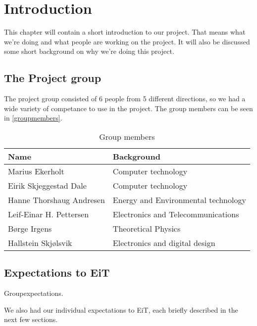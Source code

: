 \chapter{Introduction}
\label{chap:introduction}
This chapter will contain a short introduction to our project. That means what we're doing and what people are working on the project. It will also be discussed some short background on why we're doing this project.
\section{The Project group}
The project group consisted of 6 people from 5 different directions, so we had a wide variety of competance to use in the project. The group members can be seen in \autoref{groupmembers}.
\begin{table}
	\begin{center}
		\begin{tabular}{|p{4cm}|p{7cm}|}   
			\hline      
			\bf{Name} & \bf{Background} \\ 
			\hline
			Marius Ekerholt & Computer technology\\     
			\hline
			Eirik Skjeggestad Dale & Computer technology\\     
			\hline
			Hanne Thorshaug Andresen & Energy and Environmental technology\\     
			\hline
			Leif-Einar H. Pettersen & Electronics and Telecommunications\\     
			\hline
			Børge Irgens & Theoretical Physics\\     
			\hline
			Hallstein Skjølsvik & Electronics and digital design\\     
			\hline
		 \end{tabular}
	\end{center}
	\caption{Group members}
	\label{tab:groupmembers}
\end{table}

\section{Expectations to EiT}
Groupexpectations.

We also had our individual expectations to EiT, each briefly described in the next few sections.

